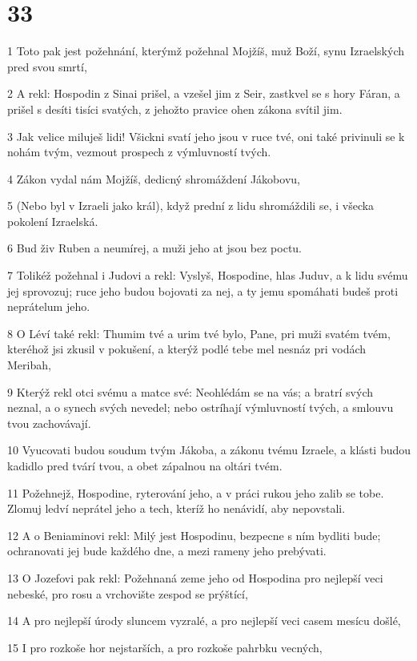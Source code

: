 \chapter{33}

\par 1 Toto pak jest požehnání, kterýmž požehnal Mojžíš, muž Boží, synu Izraelských pred svou smrtí,
\par 2 A rekl: Hospodin z Sinai prišel, a vzešel jim z Seir, zastkvel se s hory Fáran, a prišel s desíti tisíci svatých, z jehožto pravice ohen zákona svítil jim.
\par 3 Jak velice miluješ lidi! Všickni svatí jeho jsou v ruce tvé, oni také privinuli se k nohám tvým, vezmout prospech z výmluvností tvých.
\par 4 Zákon vydal nám Mojžíš, dedicný shromáždení Jákobovu,
\par 5 (Nebo byl v Izraeli jako král), když prední z lidu shromáždili se, i všecka pokolení Izraelská.
\par 6 Bud živ Ruben a neumírej, a muži jeho at jsou bez poctu.
\par 7 Tolikéž požehnal i Judovi a rekl: Vyslyš, Hospodine, hlas Juduv, a k lidu svému jej sprovozuj; ruce jeho budou bojovati za nej, a ty jemu spomáhati budeš proti neprátelum jeho.
\par 8 O Léví také rekl: Thumim tvé a urim tvé bylo, Pane, pri muži svatém tvém, kteréhož jsi zkusil v pokušení, a kterýž podlé tebe mel nesnáz pri vodách Meribah,
\par 9 Kterýž rekl otci svému a matce své: Neohlédám se na vás; a bratrí svých neznal, a o synech svých nevedel; nebo ostríhají výmluvností tvých, a smlouvu tvou zachovávají.
\par 10 Vyucovati budou soudum tvým Jákoba, a zákonu tvému Izraele, a klásti budou kadidlo pred tvárí tvou, a obet zápalnou na oltári tvém.
\par 11 Požehnejž, Hospodine, ryterování jeho, a v práci rukou jeho zalib se tobe. Zlomuj ledví neprátel jeho a tech, kteríž ho nenávidí, aby nepovstali.
\par 12 A o Beniaminovi rekl: Milý jest Hospodinu, bezpecne s ním bydliti bude; ochranovati jej bude každého dne, a mezi rameny jeho prebývati.
\par 13 O Jozefovi pak rekl: Požehnaná zeme jeho od Hospodina pro nejlepší veci nebeské, pro rosu a vrchovište zespod se prýštící,
\par 14 A pro nejlepší úrody sluncem vyzralé, a pro nejlepší veci casem mesícu došlé,
\par 15 I pro rozkoše hor nejstarších, a pro rozkoše pahrbku vecných,
